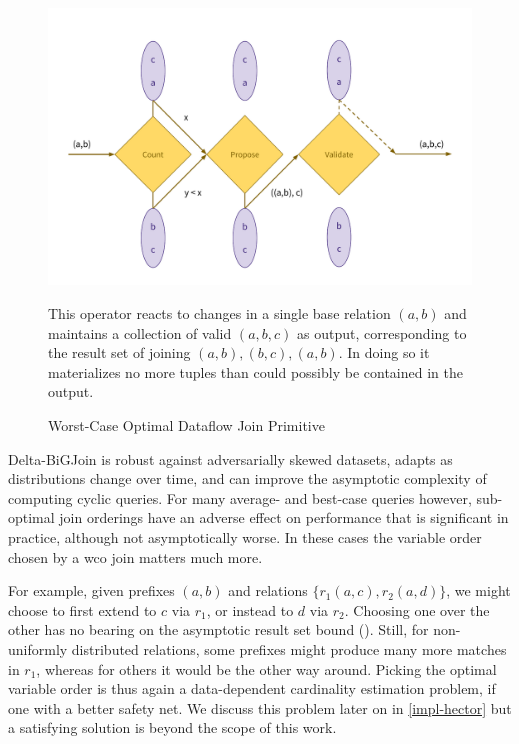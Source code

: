 \documentclass[../catalog.tex]{subfiles}
\begin{document}
\begin{figure}[h!]
  \includegraphics[width=1.0\linewidth]{diagrams/wco_dataflow}
  \caption{Worst-Case Optimal Dataflow Join Primitive}
  \label{fig:wco-illustration}
  \medskip
  \small

  This operator reacts to changes in a single base relation $(a,b)$
  and maintains a collection of valid $(a,b,c)$ as output,
  corresponding to the result set of joining $(a,b), (b,c), (a,b)$. In
  doing so it materializes no more tuples than could possibly be
  contained in the output.
\end{figure}

Delta-BiGJoin is robust against adversarially skewed datasets, adapts
as distributions change over time, and can improve the asymptotic
complexity of computing cyclic queries. For many average- and
best-case queries however, sub-optimal join orderings have an adverse
effect on performance that is significant in practice, although not
asymptotically worse. In these cases the variable order chosen by a
wco join matters much more.

For example, given prefixes $(a,b)$ and relations $\{r_1(a,c),
r_2(a,d)\}$, we might choose to first extend to $c$ via $r_1$, or
instead to $d$ via $r_2$. Choosing one over the other has no bearing
on the asymptotic result set bound (\cite{ngo2012worst}). Still, for
non-uniformly distributed relations, some prefixes might produce many
more matches in $r_1$, whereas for others it would be the other way
around. Picking the optimal variable order is thus again a
data-dependent cardinality estimation problem, if one with a better
safety net. We discuss this problem later on in \autoref{impl-hector}
but a satisfying solution is beyond the scope of this work.
\end{document}
